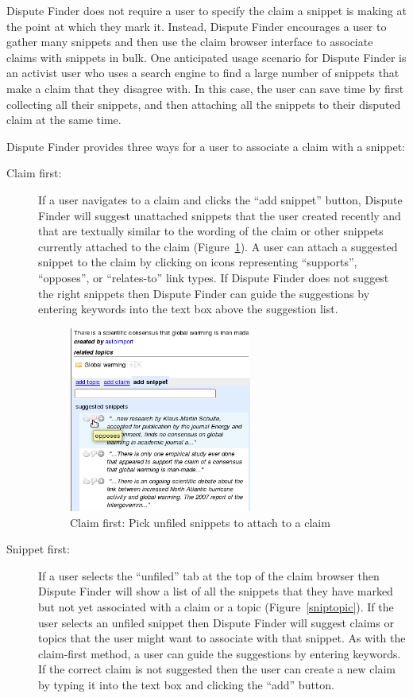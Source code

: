 \documentclass{www2010-submission}
\begin{document}
Dispute Finder does not require a user to specify the claim a snippet is making at the point at which they mark it. Instead, Dispute Finder encourages a user to gather many snippets and then use the claim browser interface to associate claims with snippets in bulk.
One anticipated usage scenario for Dispute Finder is an activist user who uses a search engine to find a large number of snippets that make a claim that they disagree with. 
In this case, the user can save time by first collecting all their snippets, and then attaching all the snippets to their disputed claim at the same time.

Dispute Finder provides three ways for a user to associate a claim with a snippet:

\begin{description}
\item[Claim first:] If a user navigates to a claim and clicks the ``add snippet'' button, Dispute Finder will suggest unattached snippets that the user created recently and that are textually similar to the wording of the claim or other snippets currently attached to the claim (Figure~\ref{snipclaim}). A user can attach a suggested snippet to the claim by clicking on icons representing ``supports'', ``opposes'', or ``relates-to'' link types. If Dispute Finder does not suggest the right snippets then Dispute Finder can guide the suggestions by entering keywords into the text box above the suggestion list.

\begin{figure}[tb]
	\begin{center}
	\includegraphics[width=6cm]{../screenshots/v2_sugsnippet.png}
	\caption{Claim first: Pick unfiled snippets to attach to a claim}
	\label{snipclaim}
	\end{center}
\end{figure}

\item[Snippet first:] If a user selects the ``unfiled'' tab at the top of the claim browser then Dispute Finder will show a list of all the snippets that they have marked but not yet associated with a claim or a topic (Figure~\ref{sniptopic}). If the user selects an unfiled snippet then Dispute Finder will suggest claims or topics that the user might want to associate with that snippet. As with the claim-first method, a user can guide the suggestions by entering keywords. If the correct claim is not suggested then the user can create a new claim by typing it into the text box and clicking the ``add'' button.


\end{description}
\end{document}
